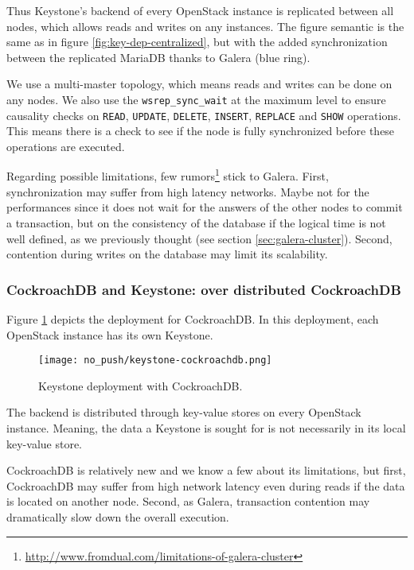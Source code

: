  Thus Keystone’s backend of every OpenStack instance is replicated between all nodes, which allows reads and writes on any instances. The figure semantic is the same as in figure \ref{fig:key-dep-centralized}, but with the added synchronization between the replicated MariaDB thanks to Galera (blue ring).

We use a multi-master topology, which means reads and writes can be done on any nodes. We also use the \verb+wsrep_sync_wait+ at the maximum level to ensure causality checks on \verb+READ+, \verb+UPDATE+, \verb+DELETE+, \verb+INSERT+, \verb+REPLACE+ and \verb+SHOW+ operations. This means there is a check to see if the node is fully synchronized before these operations are executed.

Regarding possible limitations, few rumors\footnote{\url{http://www.fromdual.com/limitations-of-galera-cluster}} stick to Galera. First, synchronization may suffer from high latency networks. Maybe not for the performances since it does not wait for the answers of the other nodes to commit a transaction, but on the consistency of the database if the logical time is not well defined, as we previously thought (see section \ref{sec:galera-cluster}). Second, contention during writes on the database may limit its scalability.



\subsubsection{CockroachDB and Keystone: over distributed CockroachDB}
Figure \ref{fig:key-dep-crdb} depicts the deployment for CockroachDB. In this deployment, each OpenStack instance has its own Keystone.

\begin{figure}[h]
  \vspace{-10pt}
  \begin{center}
    \texttt{[image: no\_push/keystone-cockroachdb.png]}
  \end{center}
  \vspace{-20pt}
  \caption{Keystone deployment with CockroachDB.}
  \vspace{-12pt}
  \label{fig:key-dep-crdb}
\end{figure}

The backend is distributed through key-value stores on every OpenStack instance. Meaning, the data a Keystone is sought for is not necessarily in its local key-value store.

CockroachDB is relatively new and we know a few about its limitations, but first, CockroachDB may suffer from high network latency even during reads if the data is located on another node. Second, as Galera, transaction contention may dramatically slow down the overall execution.

